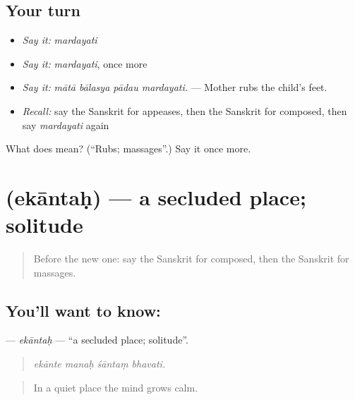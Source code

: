 \subsection*{Your turn}
\begin{itemize}
\raggedright
  \item \emph{Say it:} \emph{mardayati}
  \item \emph{Say it:} \emph{mardayati}, once more
  \item \emph{Say it:} \emph{mātā bālasya pādau mardayati.} — Mother rubs the child's feet.
  \item \emph{Recall:} say the Sanskrit for appeases, then the Sanskrit for composed, then say \emph{mardayati} again
\end{itemize}

\begin{tcolorbox}[breakable,colback=teal!4,colframe=teal!35!black,title={Before you move on}]
What does  mean? (\textquotedblleft{}Rubs; massages\textquotedblright{}.) Say it once more.
\end{tcolorbox}
\section[\texorpdfstring{\sk{एकान्तः} (ekāntaḥ)}{एकान्तः (ekāntaḥ)}]{ (ekāntaḥ) — a secluded place; solitude}

\label{lesson:SA-C456-ekantah}



\begin{quote}
Before the new one: say the Sanskrit for composed, then the Sanskrit for massages.
\end{quote}

\subsection*{You'll want to know: }
\textbf{} — \emph{ekāntaḥ} — \textquotedblleft{}a secluded place; solitude\textquotedblright{}.

\begin{quote}
   
\end{quote}

\begin{quote}
\emph{ekānte manaḥ śāntaṃ bhavati.}
\end{quote}

\begin{quote}
In a quiet place the mind grows calm.
\end{quote}

